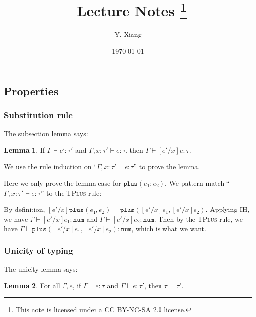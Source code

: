 \documentclass{article}
\title{\vspace{-3em}\course\, Lecture Notes \asnum\footnote{This note is licensed under a \href{https://creativecommons.org/licenses/by-nc-sa/2.0/}{CC BY-NC-SA 2.0} license.}}
\author{Y. Xiang\vspace{1em}}
\date{\today\vspace{-1em}}
\theoremstyle{definition}
\newtheorem*{lemma}{Lemma}
\begin{document}
\maketitle

\subsection{Properties}

\subsubsection*{Substitution rule}

The subsection lemma says:
\begin{lemma}
    If $\Gamma \vdash e':\tau'$ and $\Gamma, x:\tau'\vdash e:\tau$, then $\Gamma \vdash [e'/x]e:\tau$.
\end{lemma}

We use the rule induction on ``$\Gamma, x:\tau'\vdash e:\tau$'' to prove the lemma.

Here we only prove the lemma case for $\mathtt{plus}(e_1;e_2)$.
We pattern match ``$\Gamma, x:\tau'\vdash e:\tau$'' to the \textsc{TPlus} rule:
\begin{mathpar}
\end{mathpar}

By definition, $[e'/x]\mathtt{plus}(e_1,e_2) = \mathtt{plus}([e'/x]e_1, [e'/x]e_2)$. Applying IH, we have $\Gamma \vdash [e'/x]e_1:\mathtt{num}$ and $\Gamma \vdash [e'/x]e_2:\mathtt{num}$. Then by the \textsc{TPlus} rule, we have $\Gamma \vdash \mathtt{plus}([e'/x]e_1, [e'/x]e_2):\mathtt{num}$, which is what we want.

\subsubsection*{Unicity of typing}

The unicity lemma says:
\begin{lemma}
    For all $\Gamma, e$, if $\Gamma \vdash e: \tau$ and $\Gamma \vdash e: \tau'$, then $\tau = \tau'$.
\end{lemma}
\end{document}

